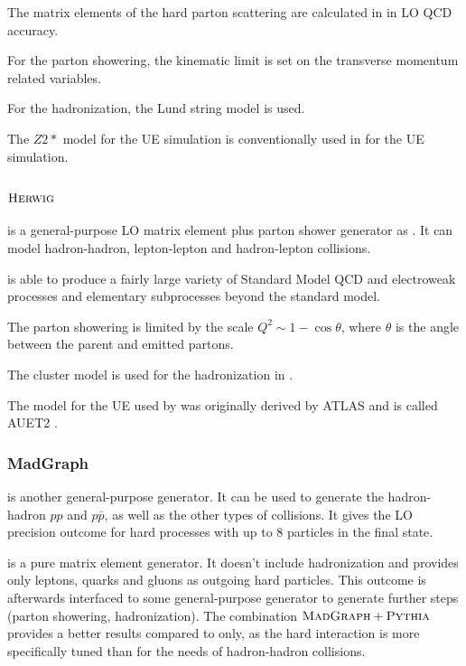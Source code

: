 The matrix elements of the hard parton scattering are calculated in \PYTHIA in LO QCD accuracy.

For the parton showering, the kinematic limit is set on the transverse momentum related variables.

For the hadronization, the Lund string model is used.

The $Z2*$ model for the UE simulation is conventionally used in \PYTHIA for the UE simulation.

\subsubsection{$\textsc{Herwig}$}

\HERWIG \cite{Corcella:2000bw} is a general-purpose LO matrix element plus parton shower generator as \PYTHIA. It can model hadron-hadron, 
lepton-lepton and hadron-lepton collisions.

\HERWIG is able to produce a fairly large variety of Standard Model QCD and electroweak processes and elementary subprocesses beyond the standard model.

The parton showering is limited by the scale $Q^{2} \sim 1 - \cos\theta$, where $\theta$ is the angle between the parent and emitted partons.

The cluster model is used for the hadronization in \HERWIG.

The model for the UE used by \HERWIG was originally derived by ATLAS and is called AUET2 \cite{ATL-PHYS-PUB-2011-009}.

\subsubsection{MadGraph}

\MG is another general-purpose generator. It can be used to generate the hadron-hadron $pp$ and $p\bar{p}$, as well as the other types of collisions.
It gives the LO precision outcome for hard processes with up to 8 particles in the final state. 

\MG is a pure matrix element generator. It doesn't include hadronization and provides only leptons, quarks and gluons as outgoing hard particles. 
This outcome is afterwards interfaced to some general-purpose generator to generate further steps (parton showering, hadronization). The combination $\textsc{MadGraph}+\textsc{Pythia}$ 
provides a better results compared to \PYTHIA only, as the \MG hard interaction is more specifically tuned than \PYTHIA for the needs of hadron-hadron collisions. 

